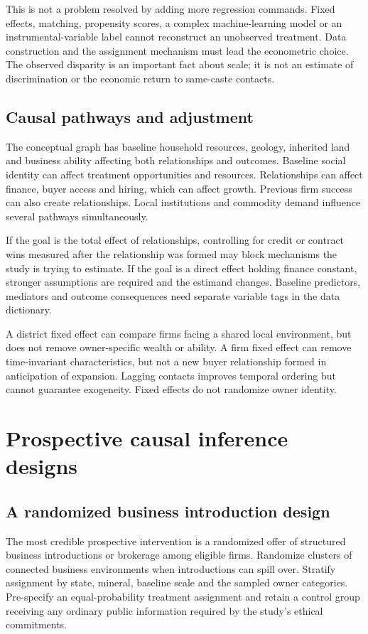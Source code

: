 \documentclass[11pt,a4paper]{report}
\begin{document}
This is not a problem resolved by adding more regression commands. Fixed effects, matching, propensity scores, a complex machine-learning model or an instrumental-variable label cannot reconstruct an unobserved treatment. Data construction and the assignment mechanism must lead the econometric choice. The observed disparity is an important fact about scale; it is not an estimate of discrimination or the economic return to same-caste contacts.

\section{Causal pathways and adjustment}
The conceptual graph has baseline household resources, geology, inherited land and business ability affecting both relationships and outcomes. Baseline social identity can affect treatment opportunities and resources. Relationships can affect finance, buyer access and hiring, which can affect growth. Previous firm success can also create relationships. Local institutions and commodity demand influence several pathways simultaneously.

If the goal is the total effect of relationships, controlling for credit or contract wins measured after the relationship was formed may block mechanisms the study is trying to estimate. If the goal is a direct effect holding finance constant, stronger assumptions are required and the estimand changes. Baseline predictors, mediators and outcome consequences need separate variable tags in the data dictionary.

A district fixed effect can compare firms facing a shared local environment, but does not remove owner-specific wealth or ability. A firm fixed effect can remove time-invariant characteristics, but not a new buyer relationship formed in anticipation of expansion. Lagging contacts improves temporal ordering but cannot guarantee exogeneity. Fixed effects do not randomize owner identity.

\chapter{Prospective causal inference designs}
\section{A randomized business introduction design}
The most credible prospective intervention is a randomized offer of structured business introductions or brokerage among eligible firms. Randomize clusters of connected business environments when introductions can spill over. Stratify assignment by state, mineral, baseline scale and the sampled owner categories. Pre-specify an equal-probability treatment assignment and retain a control group receiving any ordinary public information required by the study's ethical commitments.
\end{document}
